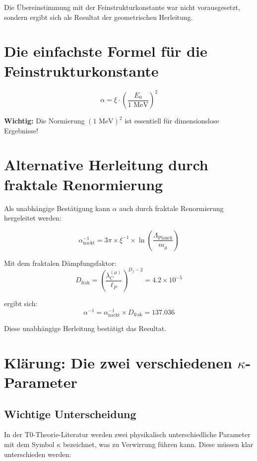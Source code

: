 \documentclass[12pt,a4paper]{article}
\theoremstyle{definition}
\begin{document}
	Die \"Ubereinstimmung mit der Feinstrukturkonstante war nicht vorausgesetzt, sondern ergibt sich als Resultat der geometrischen Herleitung.
	\section*{Die einfachste Formel für die Feinstrukturkonstante}


\[
\boxed{\alpha = \xi \cdot \left(\frac{E_0}{1 \text{ MeV}}\right)^2}
\]
\begin{tcolorbox}[colback=red!5!white,colframe=red!75!black]
	\textbf{Wichtig:} Die Normierung $(1 \text{ MeV})^2$ ist essentiell für dimensionslose Ergebnisse!
\end{tcolorbox}	
	\section{Alternative Herleitung durch fraktale Renormierung}
	
	Als unabh\"angige Best\"atigung kann $\alpha$ auch durch fraktale Renormierung hergeleitet werden:
	
	\begin{equation}
		\alpha_{\text{nackt}}^{-1} = 3\pi \times \xi^{-1} \times \ln\left(\frac{\Lambda_{\text{Planck}}}{m_\mu}\right)
	\end{equation}
	
	Mit dem fraktalen D\"ampfungsfaktor:
	\begin{equation}
		D_{\text{frak}} = \left(\frac{\lambda_C^{(\mu)}}{\ell_P}\right)^{D_f-2} = 4.2 \times 10^{-5}
	\end{equation}
	
	ergibt sich:
	\begin{equation}
		\alpha^{-1} = \alpha_{\text{nackt}}^{-1} \times D_{\text{frak}} = 137.036
	\end{equation}
	
	Diese unabh\"angige Herleitung best\"atigt das Resultat.
	
	\section{Kl\"arung: Die zwei verschiedenen $\kappa$-Parameter}
	
	\subsection{Wichtige Unterscheidung}
	
	In der T0-Theorie-Literatur werden zwei physikalisch unterschiedliche Parameter mit dem Symbol $\kappa$ bezeichnet, was zu Verwirrung f\"uhren kann. Diese m\"ussen klar unterschieden werden:
	
\end{document}
